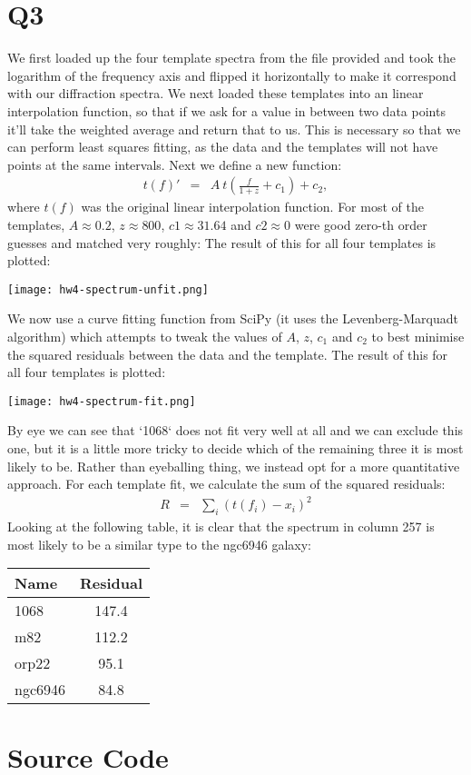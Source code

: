 \documentclass[12pt]{article}
\begin{document}
\section{Q3}
We first loaded up the four template spectra from the file provided and took the logarithm of the frequency axis and flipped it horizontally to make it correspond with our diffraction spectra.
We next loaded these templates into an linear interpolation function, so that if we ask for a value in between two data points it'll take the weighted average and return that to us.  
This is necessary so that we can perform least squares fitting, as the data and the templates will not have  points at the same intervals.
Next we define a new function:
\begin{eqnarray}
t(f)' &=& A~t(\frac{f}{1+z} + c_1) + c_2,
\end{eqnarray}
where $t(f)$ was the original linear interpolation function.
For most of the templates, $A \approx 0.2$, $z \approx 800$, $c1 \approx 31.64$ and $c2 \approx 0$ were good zero-th order guesses and matched very roughly:
The result of this for all four templates is plotted:
\begin{center}
\texttt{[image: hw4-spectrum-unfit.png]}
\end{center}

We now use a curve fitting function from SciPy (it uses the Levenberg-Marquadt algorithm) which attempts to tweak the values of $A$, $z$, $c_1$ and $c_2$ to best minimise the squared residuals between the data and the template.
The result of this for all four templates is plotted:
\begin{center}
\texttt{[image: hw4-spectrum-fit.png]}
\end{center}

By eye we can see that `1068` does not fit very well at all and we can exclude this one, but it is a little more tricky to decide which of the remaining three it is most likely to be.
Rather than eyeballing thing, we instead opt for a more quantitative approach.
For each template fit, we calculate the sum of the squared residuals:
\begin{eqnarray}
	R &=& \sum_i (t(f_i) - x_i)^2
\end{eqnarray}
Looking at the following table, it is clear that the spectrum in column 257 is most likely to be a similar type to the ngc6946 galaxy:
\begin{center}
\begin{tabular}{ l c }
Name & Residual \\
\hline
 1068 & 147.4 \\
  m82 & 112.2 \\
  orp22 & 95.1 \\
  ngc6946 & 84.8
\end{tabular}
\end{center}

\section{Source Code}

\end{document}
